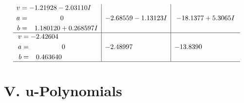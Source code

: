 \documentclass[1p]{elsarticle_modified}
\theoremstyle{definition}
\begin{document}
$$\begin{array}{c|c|c}
\begin{aligned}
v &= -1.21928 - 2.03110 I \\
a &= \phantom{-0.000000 } 0 \\
b &= \phantom{-}1.180120 + 0.268597 I\end{aligned}
 & -2.68559 - 1.13123 I & -18.1377 + 5.3065 I \\ \hline\begin{aligned}
v &= -2.42604\phantom{ +0.000000I} \\
a &= \phantom{-0.000000 } 0 \\
b &= \phantom{-}0.463640\phantom{ +0.000000I}\end{aligned}
 & -2.48997\phantom{ +0.000000I} & -13.8390\phantom{ +0.000000I}\\
 \hline 
 \end{array}$$\newpage
\newpage\renewcommand{\arraystretch}{1}
\centering \section*{ V. u-Polynomials}
\end{document}
